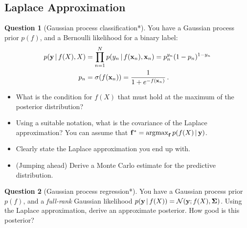 \documentclass[a4paper]{article}
\newcommand{\mat}[1]{{\boldsymbol{{#1}}}} %
\theoremstyle{definition}
\newtheorem{question}{Question}
\begin{document}
\subsection{Laplace Approximation}
\begin{question}[Gaussian process classification*]
\label{q:laplace-gpc}
You have a Gaussian process prior $p(f)$, and a Bernoulli likelihood for a binary label:
\begin{align}
p(\mathbf{y}\,|\, f(X), X) &= \prod_{n=1}^N p(y_n\,|\, f(\mathbf{x}_n), \mathbf{x}_n) = p_n^{y_n}(1-p_n)^{1 - y_n} \\
p_n &= \sigma(f(\mathbf{x}_n)) = \frac{1}{1 + e^{-f(\mathbf{x}_n)}} \,.
\end{align}
\begin{itemize}
\item What is the condition for $f(X)$ that must hold at the maximum of the posterior distribution?
\item Using a suitable notation, what is the covariance of the Laplace approximation? You can assume that $\mathbf{f}^* = \operatorname*{\arg\!\max}_{\mathbf{f}} p(f(X)\,|\, \mathbf{y})$.
\item Clearly state the Laplace approximation you end up with.
\item (Jumping ahead) Derive a Monte Carlo estimate for the predictive distribution.
\end{itemize}
\end{question}


\begin{question}[Gaussian process regression*]
\label{q:laplace-gpr}
You have a Gaussian process prior $p(f)$, and a \emph{full-rank} Gaussian likelihood $p(\vy\given f(X)) = \NormDist{\vy; f(X), \mat \Sigma}$. Using the Laplace approximation, derive an approximate posterior. How good is this posterior?
\end{question}
\end{document}
